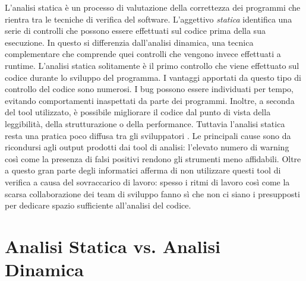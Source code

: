 L'analisi statica è un processo di valutazione della correttezza dei programmi che rientra tra le tecniche di verifica del software. L'aggettivo \textit{statica} identifica una serie di controlli che possono essere effettuati sul codice prima della sua esecuzione. In questo si differenzia dall'analisi dinamica, una tecnica complementare che comprende quei controlli che vengono invece effettuati a runtime.\newline
\indent L'analisi statica solitamente è il primo controllo che viene effettuato sul codice durante lo sviluppo del programma.
I vantaggi apportati da questo tipo di controllo del codice sono numerosi. I bug possono essere individuati per tempo, evitando comportamenti inaspettati da parte dei programmi. Inoltre, a seconda del tool utilizzato, è possibile migliorare il codice dal punto di vista della leggibilità, della strutturazione o della performance.\newline
\indent Tuttavia l'analisi statica resta una pratica poco diffusa tra gli sviluppatori \cite{johnson2013don}. Le principali cause sono da ricondursi agli output prodotti dai tool di analisi: l'elevato numero di warning così come la presenza di falsi positivi rendono gli strumenti meno affidabili. Oltre a questo gran parte degli informatici afferma di non utilizzare questi tool di verifica a causa del sovraccarico di lavoro: spesso i ritmi di lavoro così come la scarsa collaborazione dei team di sviluppo fanno sì che non ci siano i presupposti per dedicare spazio sufficiente all'analisi del codice.\newline


\section{Analisi Statica vs. Analisi Dinamica}

